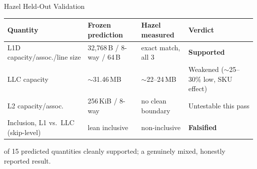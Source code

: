 \documentclass[aspectratio=169,10pt]{beamer}
\begin{document}
\begin{frame}{Hazel Held-Out Validation}
\centering
{}

\vspace{3mm}
\centering\tiny
\begin{tabular}{llll}
\toprule
Quantity & Frozen prediction & Hazel measured & Verdict\\
\midrule
L1D capacity/assoc./line size & 32,768\,B / 8-way / 64\,B & exact match, all 3 & \textbf{Supported}\\
LLC capacity & $\sim$31.46\,MB & $\sim$22--24\,MB & Weakened ($\sim$25--30\% low, SKU effect)\\
L2 capacity/assoc. & 256\,KiB / 8-way & no clean boundary & Untestable this pass\\
Inclusion, L1 vs.\ LLC (skip-level) & lean inclusive & non-inclusive & \textbf{Falsified}\\
\bottomrule
\end{tabular}

 of 15 predicted quantities cleanly supported; a genuinely mixed, honestly reported result.
\end{frame}
\end{document}

